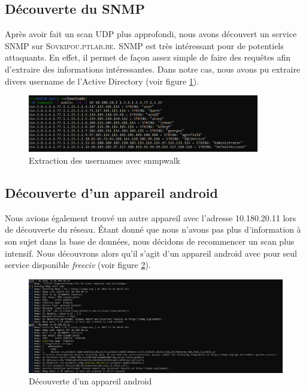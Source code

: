 \documentclass[a4paper]{article}
\begin{document}
\subsection{Découverte du SNMP}\label{sec:snmp}
Après avoir fait un scan UDP plus approfondi, nous avons découvert un service SNMP sur \textsc{Sovkipou.ptlab.be}. SNMP est très intéressant pour de potentiels attaquants. En effet, il permet de façon assez simple de faire des requêtes afin d'extraire des informations intéressantes. Dans notre cas, nous avons pu extraire divers username de l'Active Directory (voir figure \ref{fig:snmp}).
\begin{figure}[H]
    \centering
    \includegraphics[width=0.90\textwidth]{images/lab2/snmpwalk.png}
    \caption{Extraction des usernames avec snmpwalk}
    \label{fig:snmp}
\end{figure}

\subsection{Découverte d'un appareil android}
Nous avions également trouvé un autre appareil avec l'adresse 10.180.20.11 lors de découverte du réseau. Étant donné que nous n'avons pas plus d'information à son sujet dans la base de données, nous décidons de recommencer un scan plus intensif. Nous découvrons alors qu'il s'agit d'un appareil android avec pour seul service disponible \emph{freeciv} (voir figure \ref{fig:android}).

\begin{figure}[H]
    \centering
    \includegraphics[width=1\textwidth]{images/lab2/android.jpg}
    \caption{Découverte d'un appareil android}
    \label{fig:android}
\end{figure}
\end{document}
